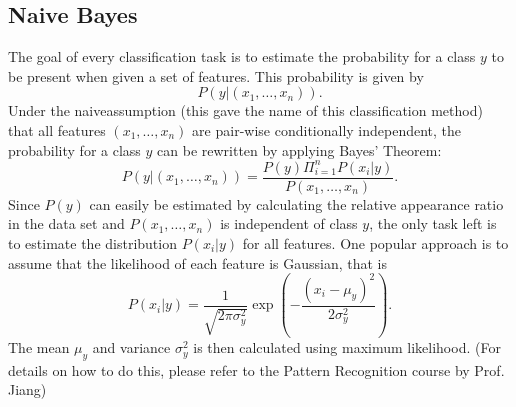 \subsection{Naive Bayes}
The goal of every classification task is to estimate the probability for a class $y$ to be present when given a set of features. This probability is given by
\begin{equation}
	P(y|(x_1,\dots,x_n)).
\end{equation}
Under the \glqq naive\grqq assumption (this gave the name of this classification method) that all features $(x_1,\dots,x_n)$ are pair-wise conditionally independent, the probability for a class $y$ can be rewritten by applying Bayes' Theorem:
\begin{equation}
	P(y|(x_1,\dots,x_n)) = \frac{P(y)\Pi_{i=1}^{n} P(x_i|y)}{P(x_1,\dots,x_n)}.
\end{equation}
Since $P(y)$ can easily be estimated by calculating the relative appearance ratio in the data set and $P(x_1,\dots,x_n)$ is independent of class $y$, the only task left is to estimate the distribution $P(x_i|y)$ for all features. One popular approach is to assume that the likelihood of each feature is Gaussian, that is
\begin{equation}
	P(x_i|y) = \frac{1}{\sqrt{2\pi \sigma_y^2}}\exp\left(-\frac{(x_i-\mu_y)^2}{2\sigma_y^2}\right).
\end{equation}
The mean $\mu_y$ and variance $\sigma_y^2$ is then calculated using maximum likelihood. (For details on how to do this, please refer to the Pattern Recognition course by Prof. Jiang)